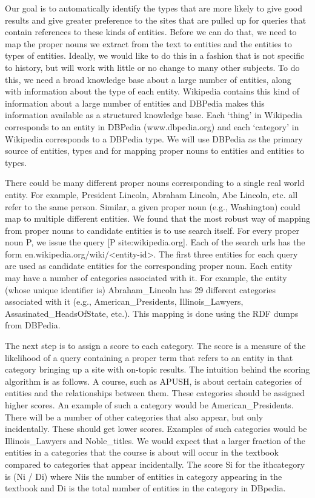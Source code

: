 \documentclass{acm_proc_article-sp}
\begin{document}
Our goal is to automatically identify the types that are more likely to give
good results and give greater preference to the sites that are pulled up for
queries that contain references to these kinds of entities. Before we can do
that, we need to map the proper nouns we extract from the text to entities and
the entities to types of entities. Ideally, we would like to do this in a
fashion that is not specific to history, but will work with little or no change
to many other subjects. To do this, we need a broad knowledge base about a large
number of entities, along with information about the type of each
entity. Wikipedia contains this kind of information about a large number of
entities and DBPedia makes this information available as a structured knowledge
base. Each ‘thing’ in Wikipedia corresponds to an entity in DBPedia
(www.dbpedia.org) and each ‘category’ in Wikipedia corresponds to a DBPedia
type. We will use DBPedia as the primary source of entities, types and for
mapping proper nouns to entities and entities to types. 

There could be many different proper nouns corresponding to a single real world
entity. For example, President Lincoln, Abraham Lincoln, Abe Lincoln, etc. all
refer to the same person. Similar, a given proper noun (e.g., Washington) could
map to multiple different entities. We found that the most robust way of mapping
from proper nouns to candidate entities is to use search itself. For every
proper noun P, we issue the query [P site:wikipedia.org]. Each of the search
urls has the form en.wikipedia.org/wiki/<entity-id>. The first three entities
for each query are used as candidate entities for the corresponding proper
noun. Each entity may have a number of categories associated with it. For
example, the entity (whose unique identifier is) Abraham\_Lincoln has 29
different categories associated with it (e.g., American\_Presidents,
Illinois\_Lawyers, Assasinated\_HeadsOfState, etc.). This mapping is done using
the RDF dumps from DBPedia. 

The next step is to assign a score to each category. The score is a measure of
the likelihood of a query containing a proper term that refers to an entity in
that category bringing up a site with on-topic results. The intuition behind the
scoring algorithm is as follows. A course, such as APUSH, is about certain
categories of entities and the relationships between them. These categories
should be assigned higher scores. An example of such a category would be
American\_Presidents. There will be a number of other categories that also
appear, but only incidentally. These should get lower scores. Examples of such
categories would be Illinois\_Lawyers and Noble\_titles. We would expect that a
larger fraction of the entities in a categories that the course is about will
occur in the textbook compared to categories that appear incidentally. The score
Si for the ithcategory is (Ni / Di) where Niis the number of entities in
category appearing in the textbook and Di is the total number of entities in the
category in DBpedia. 
\end{document}
